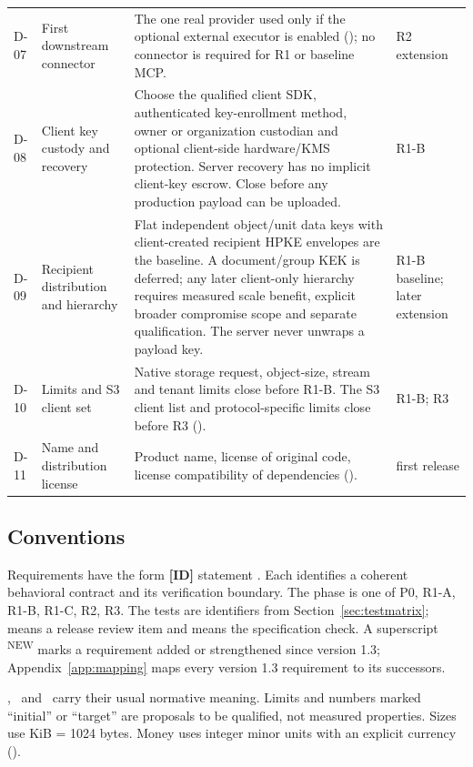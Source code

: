 \begin{longtable}{@{}P{0.06\textwidth}P{0.22\textwidth}P{0.46\textwidth}P{0.12\textwidth}@{}}
D-07 & First downstream connector & The one real provider used only if the optional external executor is enabled (); no connector is required for R1 or baseline MCP. & R2 extension\\
D-08 & Client key custody and recovery & Choose the qualified client SDK, authenticated key-enrollment method, owner or organization custodian and optional client-side hardware/KMS protection. Server recovery has no implicit client-key escrow. Close before any production payload can be uploaded. & R1-B\\
D-09 & Recipient distribution and hierarchy & Flat independent object/unit data keys with client-created recipient HPKE envelopes are the baseline. A document/group KEK is deferred; any later client-only hierarchy requires measured scale benefit, explicit broader compromise scope and separate qualification. The server never unwraps a payload key. & R1-B baseline; later extension\\
D-10 & Limits and S3 client set & Native storage request, object-size, stream and tenant limits close before R1-B. The S3 client list and protocol-specific limits close before R3 (). & R1-B; R3\\
D-11 & Name and distribution license & Product name, license of original code, license compatibility of dependencies (). & first release\\
\bottomrule
\end{longtable}

\subsection{Conventions}
Requirements have the form \textbf{[ID]} statement . Each identifies a coherent behavioral contract and its verification boundary. The phase is one of P0, R1-A, R1-B, R1-C, R2, R3. The tests are identifiers from Section~\ref{sec:testmatrix};  means a release review item and  means the specification check. A superscript \textsuperscript{\color{accent}\tiny NEW} marks a requirement added or strengthened since version 1.3; Appendix~\ref{app:mapping} maps every version 1.3 requirement to its successors.

\must, \mustnot\ and \should\ carry their usual normative meaning. Limits and numbers marked ``initial'' or ``target'' are proposals to be qualified, not measured properties. Sizes use KiB = 1024 bytes. Money uses integer minor units with an explicit currency ().

